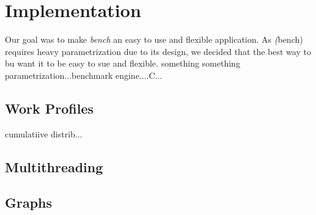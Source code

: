 \documentclass[10pt, author, twocolumn]{article}
\begin{document}
\section{Implementation}
Our goal was to make \textit{bench} an easy to use and flexible application. As \textit(bench) requires heavy parametrization due to its design, we decided that the best way to bu
want it to be easy to sue and flexible. something something parametrization...benchmark engine....C...

\subsection{Work Profiles}
cumulatiive distrib...

\subsection{Multithreading}

\subsection{Graphs}
	 
\end{document}

